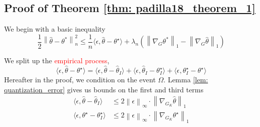 \documentclass{article}
\newcommand{\norm}[1]{\left\lVert#1\right\rVert}
\newcommand{\dotp}[2]{\langle #1, #2 \rangle}
\newcommand{\1}{\mathbb{I}}
\theoremstyle{alden}
\theoremstyle{aldenthm}
\theoremstyle{definition}
\theoremstyle{remark}
\begin{document}
\subsection{Proof of Theorem \ref{thm: padilla18_theorem_1}}
We begin with a basic inequality
\begin{equation*}
\frac{1}{2} \norm{\widehat{\theta} - \theta^*}_n^2 \leq \frac{1}{n} \dotp{\epsilon}{\widehat{\theta} - \theta^{\star}} + \lambda_n \left(\norm{\nabla_G \theta^*}_1 - \norm{\nabla_G \widehat{\theta}}_1 \right)
\end{equation*}

We split up the \textcolor{red}{empirical process},
\begin{equation*}
\dotp{\epsilon}{\widehat{\theta} - \theta^{\star}} = \dotp{\epsilon}{\widehat{\theta} - \widehat{\theta}_I} + \dotp{\epsilon}{\widehat{\theta}_I - \theta_I^{\star}} + \dotp{\epsilon}{\theta_I^{\star} - \theta^{\star}}
\end{equation*}
Hereafter in the proof, we condition on the event $\Omega$. Lemma \ref{lem: quantization_error} gives us bounds on the first and third terms
\begin{align*}
\dotp{\epsilon}{\widehat{\theta} - \widehat{\theta}_I} & \leq 2 \norm{\epsilon}_{\infty} \cdot \norm{\nabla_{G_K} \widehat{\theta} }_1 \\
\dotp{\epsilon}{\theta^{\star} - \theta_I^{\star}} & \leq 2 \norm{\epsilon}_{\infty} \cdot \norm{\nabla_{G_K} \theta^{\star} }_1
\end{align*}
\end{document}
